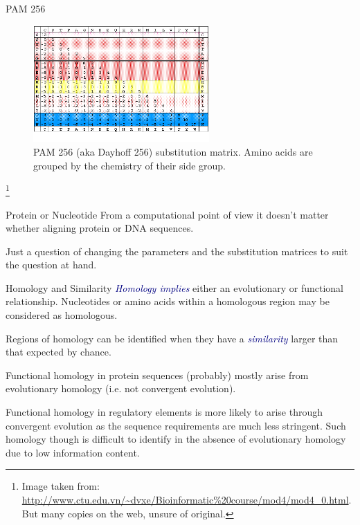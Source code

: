 \documentclass[pdf]{beamer}
\newcommand\blfootnote[1]{%
  \begingroup  %
  \renewcommand\thefootnote{}\footnote{#1}%
  \addtocounter{footnote}{-1}  %
  \endgroup
}
\begin{document}
\begin{frame}{PAM 256}
  \begin{figure}[ht]
    \includegraphics[width=0.6\textwidth]{images/dayhoff_256}
    \caption{  PAM 256 (aka Dayhoff 256) substitution matrix. Amino acids are
    grouped by the chemistry of their side group.}
  \end{figure}
  \blfootnote{Image taken from:
    \url{http://www.ctu.edu.vn/~dvxe/Bioinformatic\%20course/mod4/mod4_0.html}.\\
  But many copies on the web, unsure of original.}
\end{frame}

\begin{frame}{Protein or Nucleotide}
  From a computational point of view it doesn't matter whether aligning
  protein or DNA sequences. 

  Just a question of changing the parameters and the
  substitution matrices to suit the question at hand.

\end{frame}

\begin{frame}{Homology and Similarity}
  \textcolor{navy}{\emph{Homology implies}} either an evolutionary or functional
  relationship. Nucleotides or amino acids within a homologous
  region may be considered as homologous.

  Regions of homology can be identified when they have a \textcolor{navy}{\emph{similarity}}
  larger than that expected by chance.

  Functional homology in protein sequences (probably) mostly arise
  from evolutionary homology (i.e. not convergent evolution).

  Functional homology in regulatory elements is more likely to arise through
  convergent evolution as the sequence requirements are much less stringent.
  Such homology though is difficult to identify in the absence of evolutionary
  homology due to low information content.
  
\end{frame}
\end{document}
